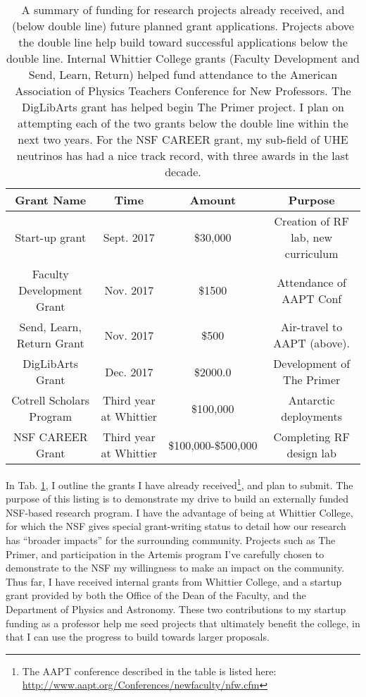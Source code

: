 \documentclass[../../main.tex]{subfiles}
\begin{document}
\begin{table}
\small
\centering
\begin{tabular}{|c|c|c|c|}
\hline \hline
Grant Name & Time & Amount & Purpose \\ \hline
Start-up grant & Sept. 2017 & \$30,000 & Creation of RF lab, new curriculum \\ \hline
Faculty Development Grant & Nov. 2017 & \$1500 & Attendance of AAPT Conf \\ \hline
Send, Learn, Return Grant & Nov. 2017 & \$500 & Air-travel to AAPT (above). \\ \hline
DigLibArts Grant & Dec. 2017 & \$2000.0 & Development of The Primer \\ \hline \hline
Cotrell Scholars Program & Third year at Whittier & \$100,000 & Antarctic deployments \\ \hline
NSF CAREER Grant & Third year at Whittier & \$100,000-\$500,000 & Completing RF design lab \\ \hline
\hline
\end{tabular}
\caption{\label{tab:fund} A summary of funding for research projects already received, and (below double line) future planned grant applications.  Projects above the double line help build toward successful applications below the double line. Internal Whittier College grants (Faculty Development and Send, Learn, Return) helped fund attendance to the American Association of Physics Teachers Conference for New Professors.  The DigLibArts grant has helped begin The Primer project.  I plan on attempting each of the two grants below the double line within the next two years.  For the NSF CAREER grant, my sub-field of UHE neutrinos has had a nice track record, with three awards in the last decade.}
\end{table}

In Tab. \ref{tab:fund}, I outline the grants I have already received\footnote{The AAPT conference described in the table is listed here: \url{http://www.aapt.org/Conferences/newfaculty/nfw.cfm}}, and plan to submit.  The purpose of this listing is to demonstrate my drive to build an externally funded NSF-based research program.  I have the advantage of being at Whittier College, for which the NSF gives special grant-writing status to detail how our research has ``broader impacts'' for the surrounding community.  Projects such as The Primer, and participation in the Artemis program I've carefully chosen to demonstrate to the NSF my willingness to make an impact on the community.  Thus far, I have received internal grants from Whittier College, and a startup grant provided by both the Office of the Dean of the Faculty, and the Department of Physics and Astronomy.  These two contributions to my startup funding as a professor help me seed projects that ultimately benefit the college, in that I can use the progress to build towards larger proposals.  \\ \hspace{0.1cm}
\end{document}
